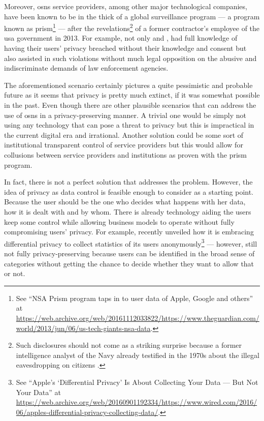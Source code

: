 Moreover, \acp{osn} service providers, among other major technological companies, 
have been known to be in the thick of a global surveillance program --- a program 
known as \Ac{prism}\footnote{See ``NSA Prism program taps in to user data of Apple, Google and others'' at \url{https://web.archive.org/web/20161112033822/https://www.theguardian.com/world/2013/jun/06/us-tech-giants-nsa-data}.} --- 
after the revelations\footnote{Such disclosures should not come as a striking surprise 
because a former intelligence analyst of the  Navy already testified in 
the 1970s about the illegal eavesdropping on  citizens \cite{Bamford14}.} 
of a former contractor's employee of the \ac{usa} government in 2013. For example, 
not only \Facebook and \Google, had full knowledge of having their users' privacy 
breached without their knowledge and consent but also assisted in such violations 
without much legal opposition on the abusive and indiscriminate demands of law enforcement 
agencies.

The aforementioned scenario certainly pictures a quite pessimistic and probable 
future as it seems that privacy is pretty much extinct, if it was somewhat possible 
in the past. Even though there are other plausible scenarios that can address the 
use of \acp{osn} in a privacy-preserving manner. A trivial one would be simply not 
using any technology that can pose a threat to privacy but this is impractical in 
the current digital era and irrational. Another solution could be some sort of institutional 
transparent control of service providers but this would allow for collusions between 
service providers and institutions as proven with the \ac{prism} program.

In fact, there is not a perfect solution that addresses the problem. However, the 
idea of privacy as data control is feasible enough to consider as a starting point. 
Because the user should be the one who decides what happens with her data, how it 
is dealt with and by whom. There is already technology aiding the users keep some 
control while allowing business models to operate without fully compromising users' 
privacy. For example, \Apple recently unveiled how it is embracing differential 
privacy to collect statistics of its users anonymously\footnote{See ``Apple's `Differential Privacy' Is About Collecting Your Data --- But Not Your Data'' at \url{https://web.archive.org/web/20160901192334/https://www.wired.com/2016/06/apples-differential-privacy-collecting-data/}.} 
--- however, still not fully privacy-preserving because users can be identified 
in the broad sense of categories without getting the chance to decide whether they 
want to allow that or not. 

